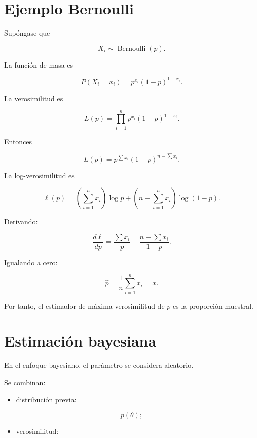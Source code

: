 \documentclass[
  spanish,
  10.5pt,
  letterpaper,
  DIV=11,
  numbers=noendperiod,
  oneside,
  open=any]{scrreprt}
\providecommand{\tightlist}{%
  \setlength{\itemsep}{0pt}\setlength{\parskip}{0pt}}
\theoremstyle{definition}
\theoremstyle{definition}
\theoremstyle{plain}
\theoremstyle{remark}
\begin{document}
\section*{Ejemplo Bernoulli}\label{ejemplo-bernoulli}


Supóngase que

\[
X_i\sim\operatorname{Bernoulli}(p).
\]

La función de masa es

\[
P(X_i=x_i)
=
p^{x_i}(1-p)^{1-x_i}.
\]

La verosimilitud es

\[
L(p)
=
\prod_{i=1}^{n}
p^{x_i}(1-p)^{1-x_i}.
\]

Entonces

\[
L(p)
=
p^{\sum x_i}
(1-p)^{n-\sum x_i}.
\]

La log-verosimilitud es

\[
\ell(p)
=
\left(
\sum_{i=1}^{n}x_i
\right)
\log p
+
\left(
n-\sum_{i=1}^{n}x_i
\right)
\log(1-p).
\]

Derivando:

\[
\frac{d\ell}{dp}
=
\frac{\sum x_i}{p}
-
\frac{n-\sum x_i}{1-p}.
\]

Igualando a cero:

\[
\widehat{p}
=
\frac{1}{n}
\sum_{i=1}^{n}x_i
=
\overline{x}.
\]

Por tanto, el estimador de máxima verosimilitud de \(p\) es la
proporción muestral.

\section*{Estimación bayesiana}\label{estimaciuxf3n-bayesiana}


En el enfoque bayesiano, el parámetro se considera aleatorio.

Se combinan:

\begin{itemize}
\tightlist
\item
  distribución previa:
\end{itemize}

\[
p(\theta);
\]

\begin{itemize}
\tightlist
\item
  verosimilitud:
\end{itemize}
\end{document}
